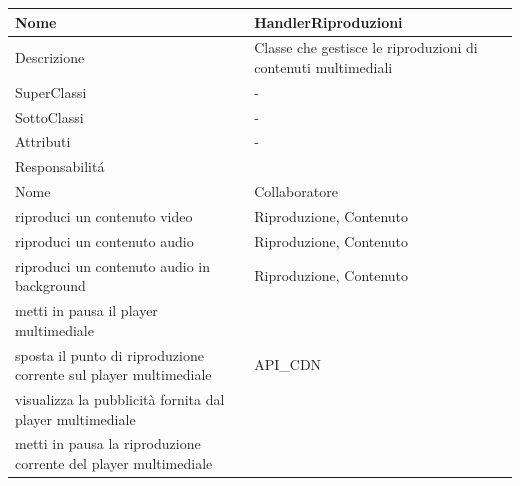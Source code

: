 \begin{center}
    \begin{tabular}{ |p{3cm}|p{3cm}|p{3cm}|p{3cm}| }
        \hline
        Nome & \multicolumn{3}{|p{9cm}|}{HandlerRiproduzioni} \\\hline
        Descrizione & \multicolumn{3}{|p{9cm}|}{Classe che gestisce le riproduzioni di contenuti multimediali} \\\hline
        SuperClassi & \multicolumn{3}{|p{9cm}|}{-} \\\hline
        SottoClassi & \multicolumn{3}{|p{9cm}|}{-} \\\hline
        Attributi & \multicolumn{3}{|p{9cm}|}{-} \\\hline
        \multicolumn{4}{|p{12cm}|}{Responsabilit\'a} \\\hline
        \multicolumn{2}{|p{6cm}|}{Nome} & \multicolumn{2}{|p{6cm}|}{Collaboratore} \\\hline
        \multicolumn{2}{|p{6cm}|}{riproduci un contenuto video} & \multicolumn{2}{|p{6cm}|}{ Riproduzione, Contenuto} \\\hline
        \multicolumn{2}{|p{6cm}|}{riproduci un contenuto audio} & \multicolumn{2}{|p{6cm}|}{ Riproduzione, Contenuto} \\\hline
        \multicolumn{2}{|p{6cm}|}{riproduci un contenuto audio in background} & \multicolumn{2}{|p{6cm}|}{ Riproduzione, Contenuto} \\\hline
        \multicolumn{2}{|p{6cm}|}{metti in pausa il player multimediale} & \multicolumn{2}{|p{6cm}|}{} \\\hline
        \multicolumn{2}{|p{6cm}|}{sposta il punto di riproduzione corrente sul player multimediale} & \multicolumn{2}{|p{6cm}|}{API\_CDN} \\\hline
        \multicolumn{2}{|p{6cm}|}{visualizza la pubblicità fornita dal player multimediale} & \multicolumn{2}{|p{6cm}|}{} \\\hline
        \multicolumn{2}{|p{6cm}|}{metti in pausa la riproduzione corrente del player multimediale} & \multicolumn{2}{|p{6cm}|}{} \\\hline
    \end{tabular}
\end{center}

